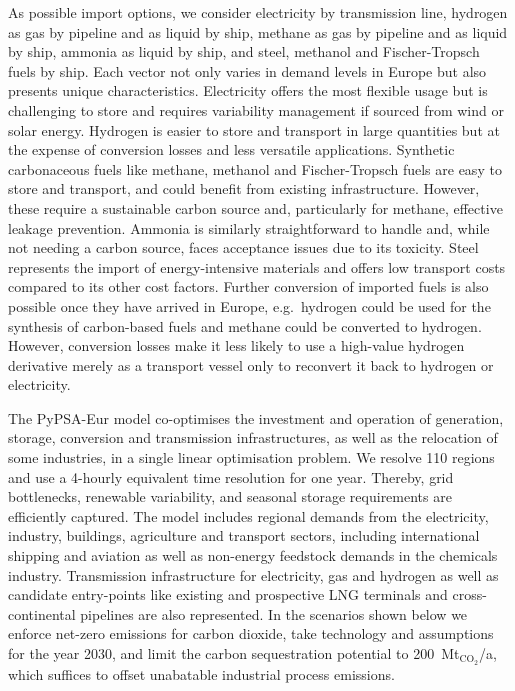 

As possible import options, we consider electricity by transmission line,
hydrogen as gas by pipeline and as liquid by ship, methane as gas by pipeline
and as liquid by ship, ammonia as liquid by ship, and steel, methanol and
Fischer-Tropsch fuels by ship. Each vector not only varies in demand levels in
Europe but also presents unique characteristics. Electricity offers the most
flexible usage but is challenging to store and requires variability management
if sourced from wind or solar energy. Hydrogen is easier to store and transport
in large quantities but at the expense of conversion losses and less versatile
applications. Synthetic carbonaceous fuels like methane, methanol and
Fischer-Tropsch fuels are easy to store and transport, and could benefit from
existing infrastructure. However, these require a sustainable carbon source and,
particularly for methane, effective leakage prevention. Ammonia is similarly
straightforward to handle and, while not needing a carbon source, faces
acceptance issues due to its toxicity. Steel represents the import of
energy-intensive materials and offers low transport costs compared to its other
cost factors. Further conversion of imported fuels is also possible once they
have arrived in Europe, e.g.~hydrogen could be used for the synthesis of
carbon-based fuels and methane could be converted to hydrogen. However,
conversion losses make it less likely to use a high-value hydrogen derivative
merely as a transport vessel only to reconvert it back to hydrogen or
electricity.


The PyPSA-Eur\cite{PyPSAEurSecSectorCoupled} model co-optimises the investment
and operation of generation, storage, conversion and transmission
infrastructures, as well as the relocation of some
industries,\cite{verpoortEstimatingRenewables2023,samadiRenewablesPull2023} in a single linear
optimisation problem. We resolve 110 regions and use a 4-hourly equivalent time
resolution for one year. Thereby, grid bottlenecks, renewable variability, and
seasonal storage requirements are efficiently captured. The model includes
regional demands from the electricity, industry, buildings, agriculture and
transport sectors, including international shipping and aviation as well as
non-energy feedstock demands in the chemicals industry. Transmission
infrastructure for electricity, gas and hydrogen as well as candidate
entry-points like existing and prospective LNG terminals and cross-continental
pipelines are also represented. In the scenarios shown below we enforce net-zero
emissions for carbon dioxide, take technology and assumptions for the year
2030,\cite{dea2019} and limit the carbon sequestration potential to
200~Mt$_{\text{CO}_2}$/a, which suffices to offset unabatable industrial process
emissions. 

